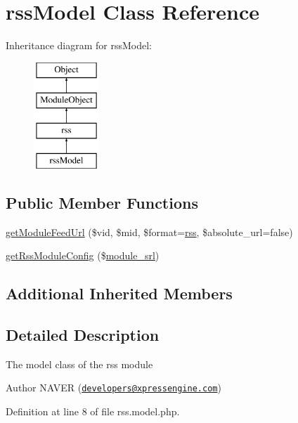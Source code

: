 \hypertarget{classrssModel}{}\section{rss\+Model Class Reference}
\label{classrssModel}
Inheritance diagram for rss\+Model\+:\begin{figure}[H]
\begin{center}
\leavevmode
\includegraphics[height=4.000000cm]{classrssModel}
\end{center}
\end{figure}
\subsection*{Public Member Functions}
\begin{DoxyCompactItemize}
\item 
\hyperlink{classrssModel_ad847b6280e577c4135f90e03f229033a}{get\+Module\+Feed\+Url} (\$vid, \$mid, \$format=\textquotesingle{}\hyperlink{classrss}{rss}\textquotesingle{}, \$absolute\+\_\+url=false)
\item 
\hyperlink{classrssModel_a3c6f9fd398a931ff32038e2a48745bad}{get\+Rss\+Module\+Config} (\$\hyperlink{ko_8install_8php_a370bb6450fab1da3e0ed9f484a38b761}{module\+\_\+srl})
\end{DoxyCompactItemize}
\subsection*{Additional Inherited Members}


\subsection{Detailed Description}
The model class of the rss module

\begin{DoxyAuthor}{Author}
N\+A\+V\+ER (\href{mailto:developers@xpressengine.com}{\tt developers@xpressengine.\+com}) 
\end{DoxyAuthor}


Definition at line 8 of file rss.\+model.\+php.



